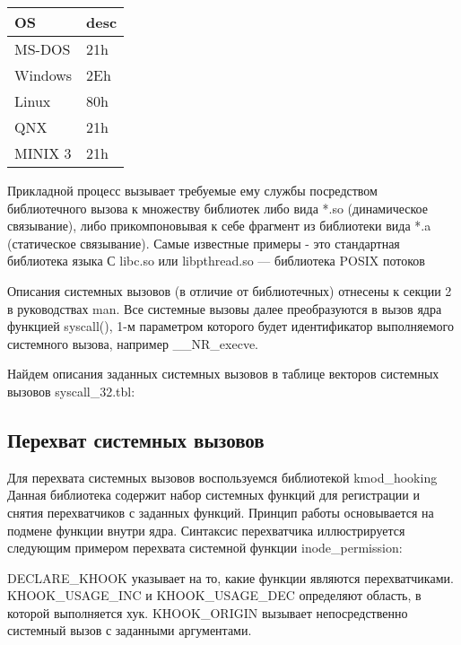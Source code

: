 \documentclass[14pt,a4paper,report]{report}
\begin{document}
\begin{table}[h!]
	\centering
	\bgroup
	\def\arraystretch{1}
	\begin{tabular}{ | m{2.2cm} | m{1.0cm} | }
		\hline
		OS & desc \\ \hline
		MS-DOS & 21h \\ \hline
		Windows & 2Eh \\ \hline
		Linux & 80h \\ \hline
		QNX & 21h \\ \hline
		MINIX 3 & 21h \\
		\hline
	\end{tabular}
	\egroup
\end{table}

Прикладной процесс вызывает требуемые ему службы посредством библиотечного вызова к множеству библиотек либо вида *.so (динамическое связывание), либо прикомпоновывая к себе фрагмент из библиотеки вида *.a (статическое связывание). Самые известные примеры - это стандартная библиотека языка С libc.so или libpthread.so — библиотека POSIX потоков \cite{cite-syscalls}

Описания системных вызовов (в отличие от библиотечных) отнесены к секции 2 в руководствах man. Все системные вызовы далее преобразуются в вызов ядра функцией syscall(), 1-м параметром которого будет идентификатор выполняемого системного вызова, например \_\_NR\_execve.

Найдем описания заданных системных вызовов в таблице векторов системных вызовов syscall\_32.tbl:



\subsection{Перехват системных вызовов}


Для перехвата системных вызовов воспользуемся библиотекой kmod\_hooking \cite{cite-hooking} Данная библиотека содержит набор системных функций для регистрации и снятия перехватчиков с заданных функций. Принцип работы основывается на подмене функции внутри ядра. Синтаксис перехватчика иллюстрируется следующим примером перехвата системной функции inode\_permission:



DECLARE\_KHOOK указывает на то, какие функции являются перехватчиками. KHOOK\_USAGE\_INC и KHOOK\_USAGE\_DEC определяют область, в которой выполняется хук. KHOOK\_ORIGIN вызывает непосредственно системный вызов с заданными аргументами.
\end{document}
